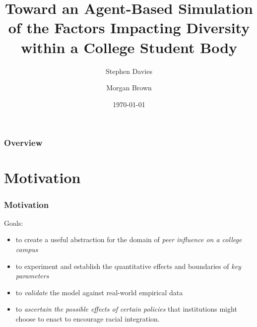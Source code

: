 \documentclass{beamer}
\title[]{Toward an Agent-Based Simulation of the Factors Impacting Diversity within a College Student Body} %
\author{Stephen Davies \inst{1} \and Morgan Brown \inst{2}} %
\institute[] %
{
\inst{1} University of Mary Washington \and \inst{2} University of Wisconsin - Madison\\ %
}
\date{\today} %
\begin{document}
\begin{frame}
\titlepage %
\end{frame}

\begin{frame}
\frametitle{Overview} %
\tableofcontents %
\end{frame}


\section{Motivation} %


\begin{frame}
\frametitle{Motivation}
Goals:

\begin{itemize}
\itemsep.1em
\item to create a useful abstraction for the domain of \textit{peer influence
on a college campus}
\item to experiment and establish the quantitative effects and boundaries of
\textit{key parameters}
\item to \textit{validate} the model against real-world empirical data
\item to \textit{ascertain the possible effects of certain policies} that
institutions might choose to enact to encourage racial integration.
\end{itemize}

\end{frame}
\end{document}
